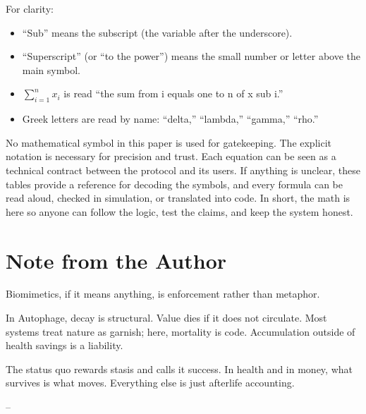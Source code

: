 \documentclass[11pt,letterpaper]{article}
\begin{document}
\vspace{0.5em}

\noindent
For clarity:
\begin{itemize}
  \item “Sub” means the subscript (the variable after the underscore).
  \item “Superscript” (or “to the power”) means the small number or letter above the main symbol.
  \item $\sum_{i=1}^n x_i$ is read “the sum from i equals one to n of x sub i.”
  \item Greek letters are read by name: “delta,” “lambda,” “gamma,” “rho.”
\end{itemize}

\vspace{0.5em}

No mathematical symbol in this paper is used for gatekeeping. The explicit notation is necessary for precision and trust. Each equation can be seen as a technical contract between the protocol and its users. If anything is unclear, these tables provide a reference for decoding the symbols, and every formula can be read aloud, checked in simulation, or translated into code. In short, the math is here so anyone can follow the logic, test the claims, and keep the system honest.

\section{Note from the Author}

Biomimetics, if it means anything, is enforcement rather than metaphor.

In Autophage, decay is structural. Value dies if it does not circulate. Most systems treat nature as garnish; here, mortality is code. Accumulation outside of health savings is a liability.

The status quo rewards stasis and calls it success. In health and in money, what survives is what moves. Everything else is just afterlife accounting.

--

\end{document}
